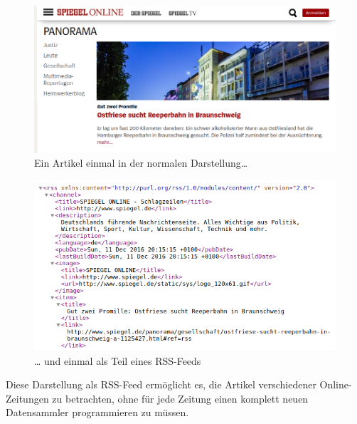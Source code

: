 \documentclass[12pt,ngerman,a4paperpaper,]{paper}
\begin{document}
\begin{no-prefix-figure-caption}

\begin{figure}
\centering
\includegraphics{img/human_readable.png}
\caption{Ein Artikel einmal in der normalen Darstellung\ldots{}}
\end{figure}

\end{no-prefix-figure-caption}

\begin{no-prefix-figure-caption}

\begin{figure}
\centering
\includegraphics{img/rss.png}
\caption{\ldots{} und einmal als Teil eines RSS-Feeds}
\end{figure}

\end{no-prefix-figure-caption}

Diese Darstellung als RSS-Feed ermöglicht es, die Artikel verschiedener
Online-Zeitungen zu betrachten, ohne für jede Zeitung einen komplett
neuen Datensammler programmieren zu müssen.
\end{document}
